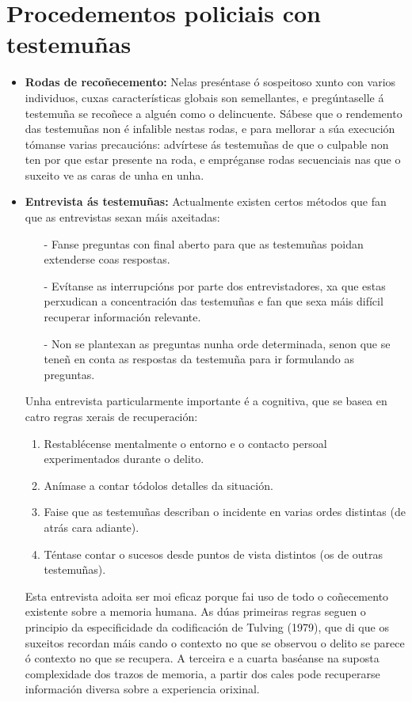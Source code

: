\documentclass[a4paper,11pt]{article}
\begin{document}
\section{Procedementos policiais con testemuñas}
\begin{itemize}
	\item \textbf{Rodas de recoñecemento:} Nelas preséntase ó sospeitoso xunto con varios 
	individuos, cuxas características globais son semellantes, e pregúntaselle á testemuña se 
	recoñece a alguén como o delincuente. Sábese que o rendemento das testemuñas non é infalible 
	nestas rodas, e para mellorar a súa execución tómanse varias precaucións: advírtese ás 
	testemuñas de que o culpable non ten por que estar presente na roda, e empréganse rodas 
	secuenciais nas que o suxeito ve as caras de unha en unha.
	\item \textbf{Entrevista ás testemuñas:} Actualmente existen certos métodos que fan que as
	entrevistas sexan máis axeitadas:
	\begin{itemize}
		\item[-] Fanse preguntas con final aberto para que as testemuñas poidan extenderse coas
		respostas.
		\item[-] Evítanse as interrupcións por parte dos entrevistadores, xa que estas perxudican a
		concentración das testemuñas e fan que sexa máis difícil recuperar información relevante.
		\item[-] Non se plantexan as preguntas nunha orde determinada, senon que se teneñ en conta 
		as respostas da testemuña para ir formulando as preguntas.
	\end{itemize}
	
	Unha entrevista particularmente importante é a cognitiva, que se basea en catro regras xerais de
	recuperación:
	\begin{enumerate}
		\item Restablécense mentalmente o entorno e o contacto persoal experimentados durante o
		delito.
		\item Anímase a contar tódolos detalles da situación.
		\item Faise que as testemuñas describan o incidente en varias ordes distintas (de atrás cara
		adiante).
		\item Téntase contar o sucesos desde puntos de vista distintos (os de outras testemuñas).
	\end{enumerate}
	
	Esta entrevista adoita ser moi eficaz porque fai uso de todo o coñecemento existente sobre a
	memoria humana. As dúas primeiras regras seguen o principio da especificidade da codificación de
	Tulving (1979), que di que os suxeitos recordan máis cando o contexto no que se observou o 
	delito se parece ó contexto no que se recupera. A terceira e a cuarta baséanse na suposta 
	complexidade dos trazos de memoria, a partir dos cales pode recuperarse información diversa 
	sobre a experiencia orixinal.
	

\end{itemize}
\end{document}
